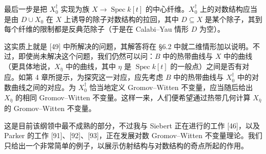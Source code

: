 最后一步是把 $X_0^{\dagger}$ 实现为族 $X\to\operatorname{Spec} k[t]$ 的中心纤维。$X_0^{\dagger}$ 上的对数结构应当是由 $D\cup X_0$ 在 $X$ 上诱导的除子对数结构的拉回，其中 $D\subseteq X$ 是某个除子，其到每个纤维的限制都是反典范除子（于是在 Calabi–Yau 情形 $D$ 为空）。

这实质上就是 [49] 中所解决的问题，其解答将在 §6.2 中就二维情形加以说明。不过，即使尚未解决这个问题，我们仍然可以问：$B$ 中的热带曲线与 $X$ 中的曲线（更具体地说，$X_{\bar\eta}$ 中的曲线，其中 $\eta$ 是 $\operatorname{Spec} k[t]$ 的一般点）之间是否有对应。如第 4 章所提示，为探究这一对应，应先考虑 $B$ 中的热带曲线与 $X_0^{\dagger}$ 中的对数曲线之间的对应。为 $X_0^{\dagger}$ 恰当地定义 Gromov–Witten 不变量，应当随后给出 $X_{\bar\eta}$ 的相同 Gromov–Witten 不变量。这样一来，人们便希望通过热带几何计算 $X_{\bar\eta}$ 的 Gromov–Witten 不变量。

这是目前该纲领中最不成熟的部分，不过我与 Siebert 正在进行的工作 [46]，以及 Parker 的工作 [91]、[92]、[93]，正在发展对数 Gromov–Witten 不变量理论。我们只给出一个非常简单的例子，以展示仿射结构与对数结构的奇点所起的作用。

